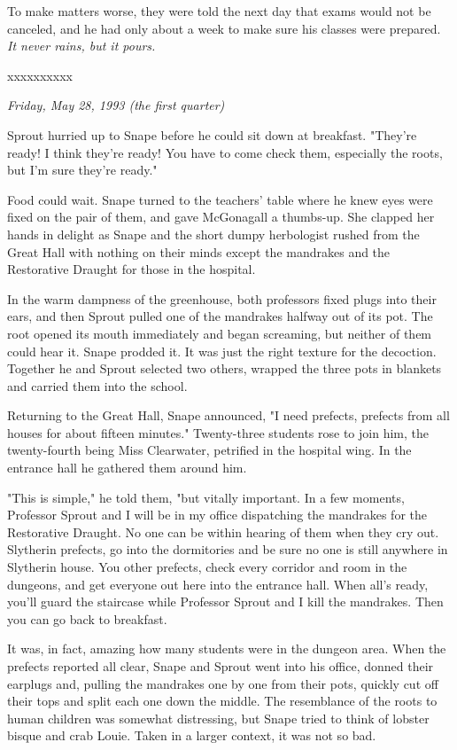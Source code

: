 \documentclass[a4paper,11pt]{article}
\begin{document}
To make matters worse, they were told the next day that exams would not be canceled, and he had only about a week to make sure his classes were prepared. \emph{It never rains, but it pours.}

xxxxxxxxxx

\emph{Friday, May 28, 1993 (the first quarter)}

Sprout hurried up to Snape before he could sit down at breakfast. "They're ready! I think they're ready! You have to come check them, especially the roots, but I'm sure they're ready."

Food could wait. Snape turned to the teachers' table where he knew eyes were fixed on the pair of them, and gave McGonagall a thumbs-up. She clapped her hands in delight as Snape and the short dumpy herbologist rushed from the Great Hall with nothing on their minds except the mandrakes and the Restorative Draught for those in the hospital.

In the warm dampness of the greenhouse, both professors fixed plugs into their ears, and then Sprout pulled one of the mandrakes halfway out of its pot. The root opened its mouth immediately and began screaming, but neither of them could hear it. Snape prodded it. It was just the right texture for the decoction. Together he and Sprout selected two others, wrapped the three pots in blankets and carried them into the school.

Returning to the Great Hall, Snape announced, "I need prefects, prefects from all houses for about fifteen minutes." Twenty-three students rose to join him, the twenty-fourth being Miss Clearwater, petrified in the hospital wing. In the entrance hall he gathered them around him.

"This is simple," he told them, "but vitally important. In a few moments, Professor Sprout and I will be in my office dispatching the mandrakes for the Restorative Draught. No one can be within hearing of them when they cry out. Slytherin prefects, go into the dormitories and be sure no one is still anywhere in Slytherin house. You other prefects, check every corridor and room in the dungeons, and get everyone out here into the entrance hall. When all's ready, you'll guard the staircase while Professor Sprout and I kill the mandrakes. Then you can go back to breakfast.

It was, in fact, amazing how many students were in the dungeon area. When the prefects reported all clear, Snape and Sprout went into his office, donned their earplugs and, pulling the mandrakes one by one from their pots, quickly cut off their tops and split each one down the middle. The resemblance of the roots to human children was somewhat distressing, but Snape tried to think of lobster bisque and crab Louie. Taken in a larger context, it was not so bad.
\end{document}
